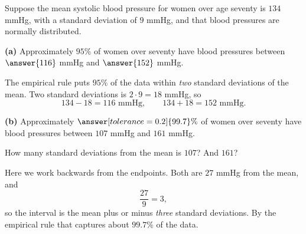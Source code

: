\documentclass[12pt]{ximera}
\begin{document}
\begin{problem}
Suppose the mean systolic blood pressure for women over age seventy is $134$ mmHg,
with a standard deviation of $9$ mmHg, and that blood pressures are normally
distributed.

\begin{prompt}
\textbf{(a)} Approximately $95\%$ of women over seventy have blood pressures between
$\answer{116}$ mmHg and $\answer{152}$ mmHg.

\begin{solution}
The empirical rule puts $95\%$ of the data within \emph{two} standard deviations of
the mean. Two standard deviations is $2 \cdot 9 = 18$ mmHg, so
\[
134 - 18 = 116 \text{ mmHg}, \qquad 134 + 18 = 152 \text{ mmHg}.
\]
\end{solution}
\end{prompt}

\begin{prompt}
\textbf{(b)} Approximately $\answer[tolerance=0.2]{99.7}\%$ of women over seventy
have blood pressures between $107$ mmHg and $161$ mmHg.

\begin{hint}
How many standard deviations from the mean is $107$? And $161$?
\end{hint}

\begin{solution}
Here we work backwards from the endpoints. Both are $27$ mmHg from the mean, and
\[
\frac{27}{9} = 3,
\]
so the interval is the mean plus or minus \emph{three} standard deviations. By the
empirical rule that captures about $99.7\%$ of the data.
\end{solution}
\end{prompt}
\end{problem}
\end{document}
